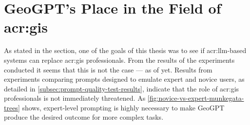 \begin{comment}

In this section it is important to include a discussion of not just the merits of the work conducted, but also the limitations.
Which choices did you make? Why? What alternatives were there?
{\color{red}\textbf{Note that a key part of the Master's Thesis grading is based on the student's ability to discuss the results in light of the work by others as well as the restrictions and potential of the work itself.}}
While the Results section will report the outcome of each specific experiments, the Discussion should put those results into perspective and look at overall lessons that can be learned from the entire series of experiments.

You should be able to discuss your work in relation to its overall goal and your research questions (i.e., those introduced in Chapter~\ref{cha:introduction}),
but also address issues such as any ethical considerations that the work may entail,
as well as its technical challenges and limitations.

Discussion and evaluation can either be two different chapters, a joint chapter (as here), or part of the concluding chapter
--- or the discussion can be part of that chapter while the evaluation is part of the experimental chapter.

As for most parts of the thesis, it is possible to select various outlines and setups for the discussion; the important thing is that all the relevant parts appear \textit{somewhere\/} in the text.
\end{comment}

\section[GeoGPT's Place in the Field of GIS]{GeoGPT's Place in the Field of \acrshort{acr:gis}}

As stated in the  section, one of the goals of this thesis was to see if \acrshort{acr:llm}-based systems can replace \acrshort{acr:gis} professionals. From the results of the experiments conducted it seems that this is not the case --- as of yet. Results from experiments comparing prompts designed to emulate expert and novice users, as detailed in \autoref{subsec:prompt-quality-test-results}, indicate that the role of \acrshort{acr:gis} professionals is not immediately threatened. As \autoref{fig:novice-vs-expert-munkegata-trees} shows, expert-level prompting is highly necessary to make GeoGPT produce the desired outcome for more complex tasks.

